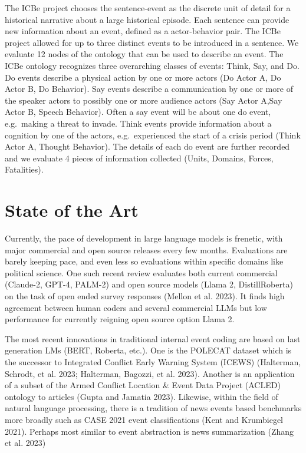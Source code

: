 \documentclass[
]{article}
\begin{document}
The ICBe project chooses the sentence-event as the discrete unit of
detail for a historical narrative about a large historical episode. Each
sentence can provide new information about an event, defined as a
actor-behavior pair. The ICBe project allowed for up to three distinct
events to be introduced in a sentence. We evaluate 12 nodes of the
ontology that can be used to describe an event. The ICBe ontology
recognizes three overarching classes of events: Think, Say, and Do. Do
events describe a physical action by one or more actors (Do Actor A, Do
Actor B, Do Behavior). Say events describe a communication by one or
more of the speaker actors to possibly one or more audience actors (Say
Actor A,Say Actor B, Speech Behavior). Often a say event will be about
one do event, e.g.~making a threat to invade. Think events provide
information about a cognition by one of the actors, e.g.~experienced the
start of a crisis period (Think Actor A, Thought Behavior). The details
of each do event are further recorded and we evaluate 4 pieces of
information collected (Units, Domains, Forces, Fatalities).

\section{State of the Art}\label{state-of-the-art}

Currently, the pace of development in large language models is frenetic,
with major commercial and open source releases every few months.
Evaluations are barely keeping pace, and even less so evaluations within
specific domains like political science. One such recent review
evaluates both current commercial (Claude-2, GPT-4, PALM-2) and open
source models (Llama 2, DistillRoberta) on the task of open ended survey
responses (Mellon et al. 2023). It finds high agreement between human
coders and several commercial LLMs but low performance for currently
reigning open source option Llama 2.

The most recent innovations in traditional internal event coding are
based on last generation LMs (BERT, Roberta, etc.). One is the POLECAT
dataset which is the successor to Integrated Conflict Early Warning
System (ICEWS) (Halterman, Schrodt, et al. 2023; Halterman, Bagozzi, et
al. 2023). Another is an application of a subset of the Armed Conflict
Location \& Event Data Project (ACLED) ontology to articles (Gupta and
Jamatia 2023). Likewise, within the field of natural language
processing, there is a tradition of news events based benchmarks more
broadly such as CASE 2021 event classifications (Kent and Krumbiegel
2021). Perhaps most similar to event abstraction is news summarization
(Zhang et al. 2023)
\end{document}
